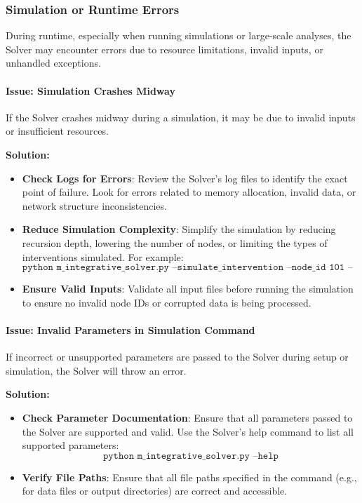 \documentclass[%
 preprint, linenumbers,
 amsmath,amssymb,
 aps, physrev,
]{revtex4-2}
\begin{document}
\subsubsection{Simulation or Runtime Errors}

During runtime, especially when running simulations or large-scale analyses, the Solver may encounter errors due to resource limitations, invalid inputs, or unhandled exceptions.

\paragraph{Issue: Simulation Crashes Midway}
If the Solver crashes midway during a simulation, it may be due to invalid inputs or insufficient resources.

\textbf{Solution:}
\begin{itemize}
    \item \textbf{Check Logs for Errors}: Review the Solver’s log files to identify the exact point of failure. Look for errors related to memory allocation, invalid data, or network structure inconsistencies.
    \item \textbf{Reduce Simulation Complexity}: Simplify the simulation by reducing recursion depth, lowering the number of nodes, or limiting the types of interventions simulated. For example:
    \[
    \texttt{python m\_integrative\_solver.py --simulate\_intervention --node\_id 101 --recursion\_depth 3}
    \]
    \item \textbf{Ensure Valid Inputs}: Validate all input files before running the simulation to ensure no invalid node IDs or corrupted data is being processed.
\end{itemize}

\paragraph{Issue: Invalid Parameters in Simulation Command}
If incorrect or unsupported parameters are passed to the Solver during setup or simulation, the Solver will throw an error.

\textbf{Solution:}
\begin{itemize}
    \item \textbf{Check Parameter Documentation}: Ensure that all parameters passed to the Solver are supported and valid. Use the Solver’s help command to list all supported parameters:
    \[
    \texttt{python m\_integrative\_solver.py --help}
    \]
    \item \textbf{Verify File Paths}: Ensure that all file paths specified in the command (e.g., for data files or output directories) are correct and accessible.
\end{itemize}
\end{document}
